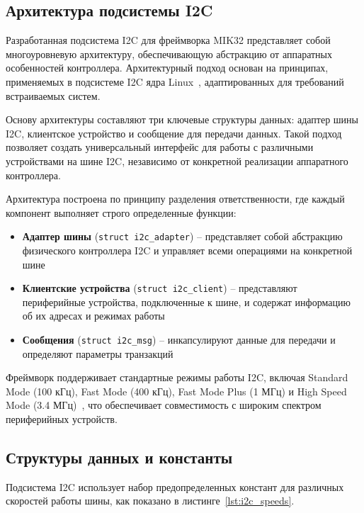 \subsection{Архитектура подсистемы I2C}

Разработанная подсистема I2C для фреймворка MIK32 представляет собой многоуровневую архитектуру, обеспечивающую абстракцию от аппаратных особенностей контроллера. Архитектурный подход основан на принципах, применяемых в подсистеме I2C ядра Linux~\cite{linux_i2c_subsystem}, адаптированных для требований встраиваемых систем.

Основу архитектуры составляют три ключевые структуры данных: адаптер шины I2C, клиентское устройство и сообщение для передачи данных. Такой подход позволяет создать универсальный интерфейс для работы с различными устройствами на шине I2C, независимо от конкретной реализации аппаратного контроллера.

Архитектура построена по принципу разделения ответственности, где каждый компонент выполняет строго определенные функции:

\begin{itemize}
	\item \textbf{Адаптер шины} (\texttt{struct i2c\_adapter}) -- представляет собой абстракцию физического контроллера I2C и управляет всеми операциями на конкретной шине
	\item \textbf{Клиентские устройства} (\texttt{struct i2c\_client}) -- представляют периферийные устройства, подключенные к шине, и содержат информацию об их адресах и режимах работы
	\item \textbf{Сообщения} (\texttt{struct i2c\_msg}) -- инкапсулируют данные для передачи и определяют параметры транзакций
\end{itemize}

Фреймворк поддерживает стандартные режимы работы I2C, включая Standard Mode (100 кГц), Fast Mode (400 кГц), Fast Mode Plus (1 МГц) и High Speed Mode (3.4 МГц)~\cite{i2c_specification}, что обеспечивает совместимость с широким спектром периферийных устройств.

\subsection{Структуры данных и константы}

Подсистема I2C использует набор предопределенных констант для различных скоростей работы шины, как показано в листинге~\ref{lst:i2c_speeds}.

\begin{listing}[H]
	\caption{Константы скоростей I2C}
	\label{lst:i2c_speeds}
\end{listing}

